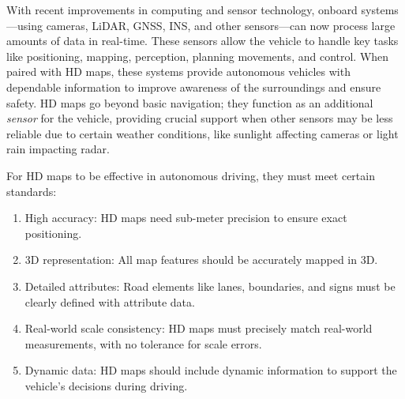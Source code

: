 With recent improvements in computing and sensor technology, onboard systems—using cameras, LiDAR, GNSS, INS, and other sensors—can now process large amounts of data in real-time. These sensors allow the vehicle to handle key tasks like positioning, mapping, perception, planning movements, and control. When paired with HD maps, these systems provide autonomous vehicles with dependable information to improve awareness of the surroundings and ensure safety.
HD maps go beyond basic navigation; they function as an additional \textit{sensor} for the vehicle, providing crucial support when other sensors may be less reliable due to certain weather conditions, like sunlight affecting cameras or light rain impacting radar\cite{edmap_2004}.

For HD maps to be effective in autonomous driving, they must meet certain standards:
\begin{enumerate}
    \item High accuracy: HD maps need sub-meter precision to ensure exact positioning.
    \item 3D representation: All map features should be accurately mapped in 3D.
    \item Detailed attributes: Road elements like lanes, boundaries, and signs must be clearly defined with attribute data.
    \item Real-world scale consistency: HD maps must precisely match real-world measurements, with no tolerance for scale errors.
    \item Dynamic data: HD maps should include dynamic information to support the vehicle’s decisions during driving.
\end{enumerate}

